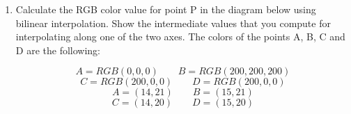 \documentclass{article}
\begin{document}
\begin{enumerate}
\begin{enumerate}
\begin{mdframed}
                        Then to get the color we do
                        $b_1c_1 + b_2 c_2 + b_3 c_3$.

                        \begin{displaymath}
                            b = [11/15, 1/5, 1/15]
                        \end{displaymath}
                        \begin{displaymath}
                            c = [187, 51, 17]
                        \end{displaymath}
                    \end{mdframed}

                \item $[3,4,0]$
                    \begin{mdframed}
                        \begin{displaymath}
                            b = [1/10, 4/5, 1/10]
                        \end{displaymath}
                        \begin{displaymath}
                            c = [26, 204, 26]
                        \end{displaymath}
                    \end{mdframed}
                \item $[5, 0.25, 0]$.
                    \begin{mdframed}
                        \begin{displaymath}
                            b = [0.14, 0.05, 0.81]
                        \end{displaymath}
                        \begin{displaymath}
                            c = [36, 13, 207]
                        \end{displaymath}
                    \end{mdframed}
            \end{enumerate}
        \item Calculate the RGB color value for point P in the diagram below using bilinear
            interpolation. Show the intermediate values that you compute for interpolating
            along one of the two axes. The colors of the points A, B, C and D are the following:

            \begin{displaymath}
                A = RGB(0,0,0) \qquad B = RGB(200, 200, 200)
            \end{displaymath}
            \begin{displaymath}
                C = RGB(200, 0, 0) \qquad D = RGB(200, 0, 0)
            \end{displaymath}
            \begin{displaymath}
                A = (14,21) \qquad B = (15,21)
            \end{displaymath}
            \begin{displaymath}
                C = (14,20) \qquad D = (15,20)
            \end{displaymath}


\end{enumerate}
\end{document}
